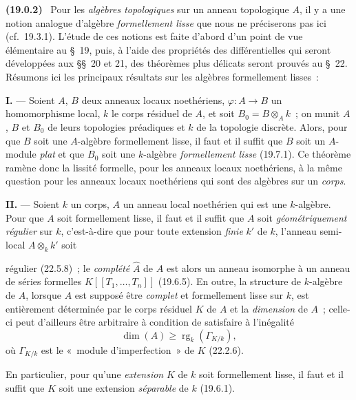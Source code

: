 \documentclass[10pt,oneside]{book}
\makeatletter
\newcommand{\setmanualcurrentlabel}[1]{\def\@currentlabel{#1}}
\newcommand{\oldpage}[2][]{%
  \setcounter{footnote}{0}%
  \marginpar{\scriptsize\textbf{#1}~|~#2}\ignorespaces}
\newenvironment{env}[1][]{\setmanualcurrentlabel{#1}\par\medskip\noindent\textbf{(#1)}\ }{\par}
\makeatother
\begin{document}
\begin{env}[19.0.2]
\label{0.19.0.2-fr}
Pour les \emph{algèbres topologiques} sur un anneau topologique $A$, il y a une
notion analogue d'algèbre \emph{formellement lisse} que nous ne préciserons pas
ici (cf.~19.3.1). L'étude de ces notions est faite d'abord d'un point de vue
élémentaire au §~19, puis, à l'aide des propriétés des différentielles qui
seront développées aux §§~20 et 21, des théorèmes plus délicats seront prouvés
au §~22. Résumons ici les principaux résultats sur les algèbres formellement
lisses~:

\medskip\noindent\textbf{I.} --- Soient $A$, $B$ deux anneaux locaux
noethériens, $\varphi:A\to B$ un homomorphisme local, $k$ le corps résiduel de
$A$, et soit $B_0=B\otimes_A k$~; on munit $A$, $B$ et $B_0$ de leurs
topologies préadiques et $k$ de la topologie discrète. Alors, pour que $B$ soit
une $A$-algèbre formellement lisse, il faut et il suffit que $B$ soit un
$A$-module \emph{plat} et que $B_0$ soit une $k$-algèbre \emph{formellement
lisse} (19.7.1). Ce théorème ramène donc la lissité formelle, pour les anneaux
locaux noethériens, à la même question pour les anneaux locaux noethériens qui
sont des algèbres sur un \emph{corps}.

\medskip\noindent\textbf{II.} --- Soient $k$ un corps, $A$ un anneau local
noethérien qui est une $k$-algèbre. Pour que $A$ soit formellement lisse, il
faut et il suffit que $A$ soit \emph{géométriquement régulier} sur $k$,
c'est-à-dire que pour toute extension \emph{finie} $k'$ de $k$, l'anneau
semi-local $A\otimes_k k'$ soit

\oldpage[0\textsubscript{IV-1}]{70}

\noindent régulier (22.5.8)~; le \emph{complété} $\widehat A$ de $A$ est alors
un anneau isomorphe à un anneau de séries formelles
$K[[T_1,\ldots,T_n]]$ (19.6.5). En outre, la structure de $k$-algèbre de $A$,
lorsque $A$ est supposé être \emph{complet} et formellement lisse sur $k$, est
entièrement déterminée par le corps résiduel $K$ de $A$ et la \emph{dimension}
de $A$~; celle-ci peut d'ailleurs être arbitraire à condition de satisfaire à
l'inégalité
\[
  \dim(A)\geq \operatorname{rg}_k(\Gamma_{K/k}),
\]
où $\Gamma_{K/k}$ est le «~module d'imperfection~» de $K$ (22.2.6).

En particulier, pour qu'une \emph{extension} $K$ de $k$ soit formellement
lisse, il faut et il suffit que $K$ soit une extension \emph{séparable} de $k$
(19.6.1).


\end{env}
\end{document}
